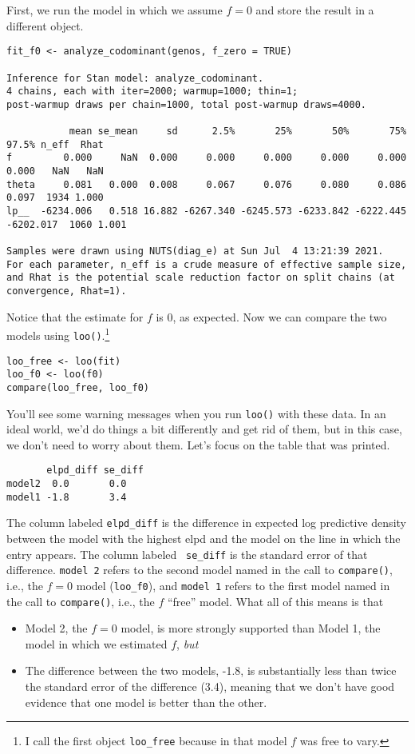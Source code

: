 First, we run the model in which we assume $f = 0$ and store the
result in a different object.
\begin{verbatim}
fit_f0 <- analyze_codominant(genos, f_zero = TRUE)

Inference for Stan model: analyze_codominant.
4 chains, each with iter=2000; warmup=1000; thin=1; 
post-warmup draws per chain=1000, total post-warmup draws=4000.

           mean se_mean     sd      2.5%       25%       50%       75%     97.5% n_eff  Rhat
f         0.000     NaN  0.000     0.000     0.000     0.000     0.000     0.000   NaN   NaN
theta     0.081   0.000  0.008     0.067     0.076     0.080     0.086     0.097  1934 1.000
lp__  -6234.006   0.518 16.882 -6267.340 -6245.573 -6233.842 -6222.445 -6202.017  1060 1.001

Samples were drawn using NUTS(diag_e) at Sun Jul  4 13:21:39 2021.
For each parameter, n_eff is a crude measure of effective sample size,
and Rhat is the potential scale reduction factor on split chains (at 
convergence, Rhat=1).
\end{verbatim}
Notice that the estimate for $f$ is 0, as expected. Now we can
compare the two models using {\tt loo()}.\footnote{I call the first
  object {\tt loo\_free} because in that model $f$ was free to vary.}
\begin{verbatim}
loo_free <- loo(fit)
loo_f0 <- loo(f0)
compare(loo_free, loo_f0)
\end{verbatim}
You'll see some warning messages when you run {\tt loo()} with these
data. In an ideal world, we'd do things a bit differently and get rid
of them, but in this case, we don't need to worry about them. Let's
focus on the table that was printed.
\begin{verbatim}
       elpd_diff se_diff
model2  0.0       0.0   
model1 -1.8       3.4   
\end{verbatim}
The column labeled {\tt elpd\_diff} is the difference in expected log
predictive density between the model with the highest elpd and the
model on the line in which the entry appears. The column labeled {\tt
  se\_diff} is the standard error of that difference. {\tt model 2}
refers to the second model named in the call to {\tt compare()}, i.e.,
the $f=0$ model ({\tt loo\_f0}), and {\tt model 1} refers to the first
model named in the call to {\tt compare()}, i.e., the $f$ ``free''
model. What all of this means is that

\begin{itemize}

  \item Model 2, the $f=0$ model, is more strongly supported than
    Model 1, the model in which we estimated $f$, {\it but}

  \item The difference between the two models, -1.8, is substantially
    less than twice the standard error of the difference (3.4),
    meaning that we don't have good evidence that one model is better
    than the other.
    
\end{itemize}

